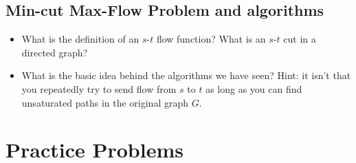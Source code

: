 \documentclass[11  pt]{exam}
\begin{document}
	\subsection{Min-cut Max-Flow Problem and algorithms}

	\begin{itemize}	
		\item What is the definition of an $s$-$t$ flow function? What is an $s$-$t$ cut in a directed graph?
		\item What is the basic idea behind the algorithms we have seen? Hint: it isn't that you repeatedly try to send flow from $s$ to $t$ as long as you can find unsaturated paths in the original graph $G$. 
	\end{itemize}

	\section{Practice Problems}
	
\end{document}
